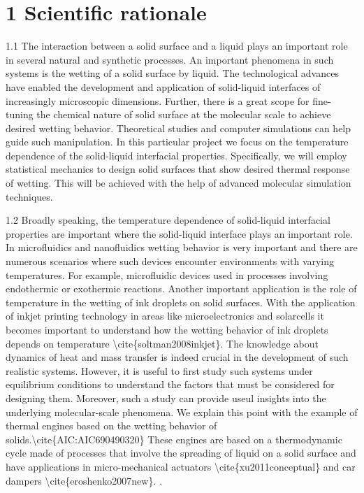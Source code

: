 \section{1 Scientific rationale}

\par 1.1 The interaction between a solid surface and a liquid plays an important role in several natural and synthetic processes. An important phenomena in such systems is the wetting of a solid surface by liquid. The technological advances have enabled the development and application of solid-liquid interfaces  of increasingly microscopic dimensions. Further, there is a great scope for fine-tuning the chemical nature of solid surface at the molecular scale to achieve desired wetting behavior. Theoretical studies and computer simulations can help guide such manipulation. In this particular project we focus on the temperature dependence of the solid-liquid interfacial properties. Specifically, we will employ statistical mechanics to design solid surfaces that show desired thermal response of wetting. This will be achieved with the help of advanced molecular simulation techniques.
\par 1.2 Broadly speaking, the temperature dependence of solid-liquid interfacial properties are important where the solid-liquid interface plays an important role. In microfluidics and nanofluidics wetting behavior is very important and there are numerous scenarios where such devices encounter environments with varying temperatures. For example, microfluidic devices used in processes involving endothermic or exothermic reactions. Another important application is the role of temperature in the wetting of ink droplets on solid surfaces. With the application of inkjet printing technology in areas like microelectronics and solarcells it becomes important to understand how the wetting behavior of ink droplets depends on temperature \textbackslash cite\{soltman2008inkjet\}. The knowledge about dynamics of heat and mass transfer is indeed crucial in the development of such realistic systems. However, it is useful to first study such systems under equilibrium conditions to understand the factors that must be considered for designing them. Moreover, such a study can provide useul insights into the underlying molecular-scale phenomena. We explain this point with the example of thermal engines based on the wetting behavior of solids.\textbackslash cite\{AIC:AIC690490320\} These engines are based on a thermodynamic cycle made of processes that involve the spreading of liquid on a solid surface and have applications in micro-mechanical actuators \textbackslash cite\{xu2011conceptual\} and car dampers \textbackslash cite\{eroshenko2007new\}. .
